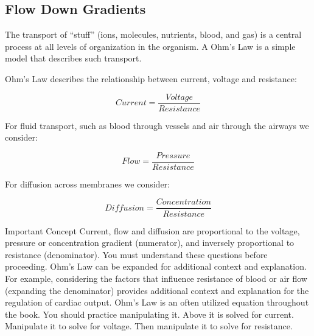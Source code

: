 \subsection{Flow Down Gradients}
The transport of “stuff” (ions, molecules, nutrients, blood, and gas) is a central process at all levels of organization in the organism. A Ohm’s Law is a simple model that describes such transport. 

\vspace{0.2in}

\begin{flushleft}
Ohm's Law describes the relationship between current, voltage and resistance:
\end{flushleft}

\begin{equation} 
\label{ohms_eq}
Current = \frac{Voltage}{Resistance}
\end{equation}

\vspace{0.2in}

\begin{flushleft}
For fluid transport, such as blood through vessels and air through the airways we consider: 
\end{flushleft}
\begin{equation} 
\label{flow_eq}
Flow = \frac{Pressure}{Resistance}
\end{equation}

\vspace{0.2in}

\begin{flushleft}
For diffusion across membranes we consider:    
\end{flushleft}

\begin{equation} 
\label{diffusion_eq}
Diffusion = \frac{Concentration}{Resistance}
\end{equation}

\vspace{0.2in}

\begin{backgroundinformation}{Important Concept}
Current, flow and diffusion are proportional to the voltage, pressure or concentration gradient (numerator), and inversely proportional to resistance (denominator). You must understand these questions before proceeding.
Ohm's Law can be expanded for additional context and explanation. For example, considering the factors that influence resistance of blood or air flow (expanding the denominator) provides additional context and explanation for the regulation of cardiac output.
Ohm's Law is an often utilized equation throughout the book. You should practice manipulating it. Above it is solved for current. Manipulate it to solve for voltage. Then manipulate it to solve for resistance. 
\end{backgroundinformation}

